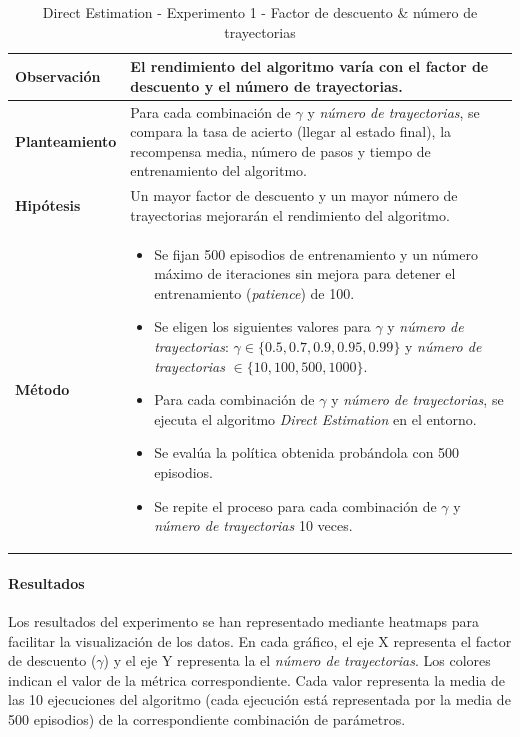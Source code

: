\begin{table}[H]
    \centering
    \begin{tabularx}{\textwidth}{|p{4cm}|X|} %
        \hline %
        \textbf{Observación} & El rendimiento del algoritmo varía con el factor de descuento y el número de trayectorias.
        \\ \hline
        \textbf{Planteamiento} & Para cada combinación de \(\gamma\) y \textit{número de trayectorias}, se compara la tasa de acierto (llegar al estado final), la recompensa media, número de pasos y tiempo de entrenamiento del algoritmo.
        \\ \hline
        \textbf{Hipótesis} & Un mayor factor de descuento y un mayor número de trayectorias mejorarán el rendimiento del algoritmo.
        \\ \hline
        \textbf{Método} & 
        \begin{itemize}
            \item Se fijan 500 episodios de entrenamiento y un número máximo de iteraciones sin mejora para detener el entrenamiento (\textit{patience}) de 100.
            \item Se eligen los siguientes valores para \(\gamma\) y \textit{número de trayectorias}: \(\gamma \in \{0.5, 0.7, 0.9, 0.95, 0.99\}\) y \textit{número de trayectorias} \(\in \{10, 100, 500, 1000\}\).
            \item Para cada combinación de \(\gamma\) y \textit{número de trayectorias}, se ejecuta el algoritmo \textit{Direct Estimation} en el entorno.
            \item Se evalúa la política obtenida probándola con 500 episodios.
            \item Se repite el proceso para cada combinación de \(\gamma\) y \textit{número de trayectorias} 10 veces.
        \end{itemize}
        \\ \hline
    \end{tabularx}
    \caption{Direct Estimation - Experimento 1 - Factor de descuento \& número de trayectorias}
    \label{tab:diseñoDirectEstimationExp1}
\end{table}

\newpage
\paragraph{Resultados}

Los resultados del experimento se han representado mediante heatmaps para facilitar la visualización de los datos. En cada gráfico, el eje X representa el factor de descuento ($\gamma$) y el eje Y representa la el \textit{número de trayectorias}. Los colores indican el valor de la métrica correspondiente. Cada valor representa la media de las 10 ejecuciones del algoritmo (cada ejecución está representada por la media de 500 episodios) de la correspondiente combinación de parámetros. 

